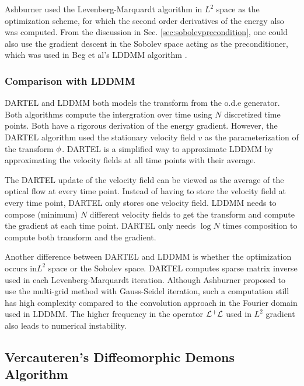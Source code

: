 \documentclass[letterpaper,12pt]{article}
\begin{document}
Ashburner used the Levenberg-Marquardt algorithm in $L^2$ space as the optimization scheme, for which the second order derivatives of the energy also was computed. From the discussion in Sec. \ref{sec:sobolevprecondition}, one could also use the gradient descent in the Sobolev space acting as the preconditioner, which was used in Beg et al's LDDMM algorithm \cite{Beg2005Computing}. 

\subsubsection{Comparison with LDDMM}

DARTEL and LDDMM both models the transform from the o.d.e generator. Both algorithms compute the intergration over time using $N$ discretized time points. Both have a rigorous derivation of the energy gradient. 
However, the DARTEL algorithm used the stationary velocity field $v$
as the parameterization of the transform $\phi$. DARTEL is a simplified way to approximate LDDMM by approximating the velocity fields at all time points with their average.

The DARTEL update of the velocity field can be viewed as the average
of the optical flow at every time point. Instead of having to store
the velocity field at every time point, DARTEL only stores one
velocity field. LDDMM needs to compose (minimum) $N$ different velocity fields to get the transform and compute the gradient at each time point. DARTEL only needs $\log N$ times composition to compute both transform and the gradient. 

Another difference between DARTEL and LDDMM is whether the
optimization occurs in$L^2$ space or the Sobolev space. DARTEL
computes sparse matrix inverse used in each Levenberg-Marquardt
iteration. Although Ashburner proposed to use the multi-grid method with
Gauss-Seidel iteration, such a computation still has high complexity compared to the convolution approach in the Fourier domain used in LDDMM. The higher frequency in the operator $\mathcal{L}^+\mathcal{L}$ used in $L^2$ gradient also leads to numerical instability.



\subsection{Vercauteren's Diffeomorphic Demons Algorithm}
\end{document}
